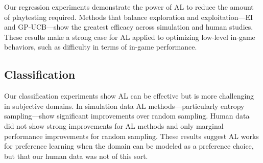 \documentclass{sig-alternate}
\begin{document}
Our regression experiments demonstrate the power of AL to reduce the amount of playtesting required.
Methods that balance exploration and exploitation---EI and GP-UCB---show the greatest efficacy across simulation and human studies.
These results make a strong case for AL applied to optimizing low-level in-game behaviors, such as difficulty in terms of in-game performance.


\subsection{Classification}
Our classification experiments show AL can be effective but is more challenging in subjective domains.
In simulation data AL methods---particularly entropy sampling---show significant improvements over random sampling.
Human data did not show strong improvements for AL methods and only marginal performance improvements for random sampling.
These results suggest AL works for preference learning when the domain can be modeled as a preference choice, but that our human data was not of this sort.
\end{document}
